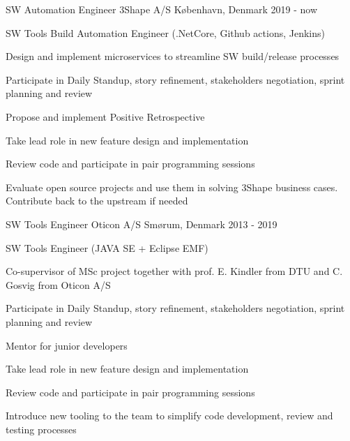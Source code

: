 \newcommand{\SubItem}[1]{
    {\setlength\itemindent{15pt} \item[-] #1}
}


\begin{cventries}



  \cventry
    {SW Automation Engineer} %
    {3Shape A/S} %
    {København, Denmark} %
    {2019 - now} %
    {
      \begin{cvitems} %
        \item {SW Tools Build Automation Engineer (.NetCore, Github actions, Jenkins)}
        \item {Design and implement microservices to streamline SW build/release processes}
        \item {Participate in Daily Standup, story refinement, stakeholders negotiation, sprint planning and review}
        \item {Propose and implement Positive Retrospective}
        \item {Take lead role in new feature design and implementation}
        \item {Review code and participate in pair programming sessions}
        \item {Evaluate open source projects and use them in solving 3Shape business cases. Contribute back to the upstream if needed}
      \end{cvitems}
    }

  \cventry
    {SW Tools Engineer} %
    {Oticon A/S} %
    {Smørum, Denmark} %
    {2013 - 2019} %
    {
      \begin{cvitems} %
        \item {SW Tools Engineer (JAVA SE + Eclipse EMF)}
        \item {Co-supervisor of MSc project together with prof. E. Kindler from DTU and C. Gosvig from Oticon A/S}
        \item {Participate in Daily Standup, story refinement, stakeholders negotiation, sprint planning and review}
        \item {Mentor for junior developers}
        \item {Take lead role in new feature design and implementation}
        \item {Review code and participate in pair programming sessions}
        \item {Introduce new tooling to the team to simplify code development, review and testing processes}
      \end{cvitems}
    }


\end{cventries}
